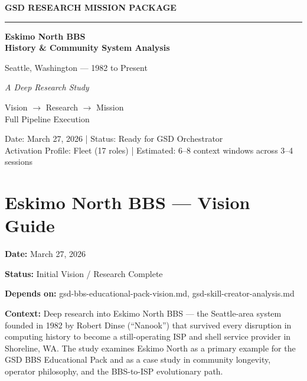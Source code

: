 \documentclass[11pt,letterpaper]{article}
\newcommand{\stageheader}[2]{%
  \noindent\colorbox{#2}{\makebox[\textwidth][l]{%
    \textcolor{white}{\bfseries\sffamily\hspace{6pt}#1\hspace{6pt}}}}%
  \vspace{0.5em}\par%
}
\newcommand{\metafield}[2]{\textbf{\sffamily #1} #2\par}
\begin{document}
\thispagestyle{empty}
\begin{center}
\vspace*{3cm}

{\small\sffamily\textcolor{primary}{\textbf{GSD RESEARCH MISSION PACKAGE}}}

\vspace{0.3cm}
\textcolor{bordergray}{\rule{8cm}{0.4pt}}

\vspace{1.5cm}
{\fontsize{28}{34}\selectfont\bfseries\sffamily\textcolor{primary}{Eskimo North BBS\\[0.3em]History \& Community System Analysis}}

\vspace{0.8cm}
{\Large\sffamily\textcolor{secondary}{Seattle, Washington --- 1982 to Present}}

\vspace{0.5cm}
{\large\sffamily\itshape\textcolor{tertiary}{A Deep Research Study}}

\vspace{3cm}
{\sffamily\textcolor{accent}{Vision $\rightarrow$ Research $\rightarrow$ Mission}}\\[0.3em]
{\small\sffamily\textcolor{accent}{Full Pipeline Execution}}

\vspace{3cm}
{\small\sffamily\textcolor{subtlegray}{Date: March 27, 2026  |  Status: Ready for GSD Orchestrator}}\\[0.3em]
{\small\sffamily\textcolor{subtlegray}{Activation Profile: Fleet (17 roles)  |  Estimated: 6--8 context windows across 3--4 sessions}}
\end{center}
\newpage

\tableofcontents
\newpage

\stageheader{STAGE 1 --- VISION DOCUMENT}{primary}

\section{Eskimo North BBS --- Vision Guide}

\metafield{Date:}{March 27, 2026}
\metafield{Status:}{Initial Vision / Research Complete}
\metafield{Depends on:}{gsd-bbs-educational-pack-vision.md, gsd-skill-creator-analysis.md}
\metafield{Context:}{Deep research into Eskimo North BBS --- the Seattle-area system founded in 1982 by Robert Dinse (``Nanook'') that survived every disruption in computing history to become a still-operating ISP and shell service provider in Shoreline, WA. The study examines Eskimo North as a primary example for the GSD BBS Educational Pack and as a case study in community longevity, operator philosophy, and the BBS-to-ISP evolutionary path.}
\end{document}
